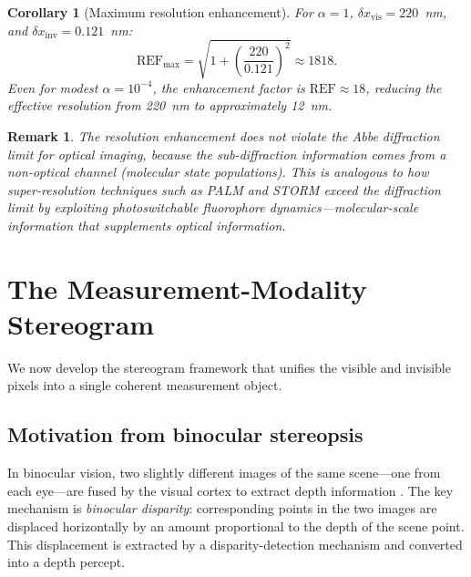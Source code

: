 \documentclass[11pt,twocolumn,a4paper]{article}
\newtheorem{corollary}[theorem]{Corollary}
\newtheorem{remark}{Remark}
\begin{document}
\begin{corollary}[Maximum resolution enhancement]\label{cor:max_ref}
For $\alpha = 1$, $\delta x_{\mathrm{vis}} = 220$~nm, and $\delta x_{\mathrm{inv}} = 0.121$~nm:
\begin{equation}
\mathrm{REF}_{\max} = \sqrt{1 + \left(\frac{220}{0.121}\right)^2} \approx 1818.
\end{equation}
Even for modest $\alpha = 10^{-4}$, the enhancement factor is $\mathrm{REF} \approx 18$, reducing the effective resolution from 220~nm to approximately 12~nm.
\end{corollary}

\begin{remark}
The resolution enhancement does not violate the Abbe diffraction limit for optical imaging, because the sub-diffraction information comes from a non-optical channel (molecular state populations).
This is analogous to how super-resolution techniques such as PALM \citep{Betzig2006} and STORM \citep{Rust2006} exceed the diffraction limit by exploiting photoswitchable fluorophore dynamics---molecular-scale information that supplements optical information.
\end{remark}



\section{The Measurement-Modality Stereogram}\label{sec:stereogram}

We now develop the stereogram framework that unifies the visible and invisible pixels into a single coherent measurement object.

\subsection{Motivation from binocular stereopsis}

In binocular vision, two slightly different images of the same scene---one from each eye---are fused by the visual cortex to extract depth information \citep{Julesz1971,Marr1982}.
The key mechanism is \emph{binocular disparity}: corresponding points in the two images are displaced horizontally by an amount proportional to the depth of the scene point.
This displacement is extracted by a disparity-detection mechanism and converted into a depth percept.
\end{document}
